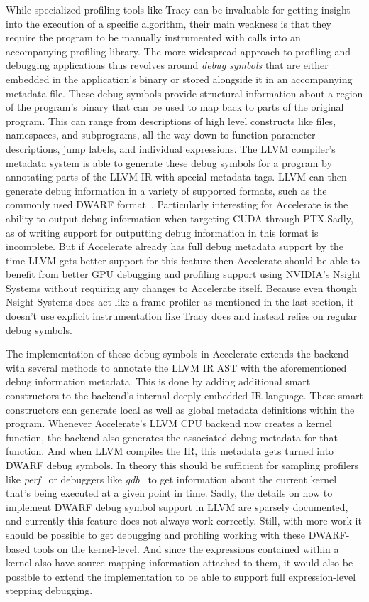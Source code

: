 \documentclass[fontsize=11pt,a4paper,parskip=half,numbers=noenddot]{scrartcl}
\begin{document}
While specialized profiling tools like Tracy can be invaluable for getting
insight into the execution of a specific algorithm, their main weakness is that
they require the program to be manually instrumented with calls into an
accompanying profiling library. The more widespread approach to profiling and
debugging applications thus revolves around \emph{debug symbols} that are either
embedded in the application's binary or stored alongside it in an accompanying
metadata file. These debug symbols provide structural information about a region
of the program's binary that can be used to map back to parts of the original
program. This can range from descriptions of high level constructs like files,
namespaces, and subprograms, all the way down to function parameter
descriptions, jump labels, and individual expressions. The LLVM compiler's
metadata system is able to generate these debug symbols for a program by
annotating parts of the LLVM IR with special metadata tags. LLVM can then
generate debug information in a variety of supported formats, such as the
commonly used DWARF format~\cite{dwarf-debug-symbols}. Particularly interesting
for Accelerate is the ability to output debug information when targeting CUDA
through PTX.\@ Sadly, as of writing support for outputting debug information in
this format is incomplete. But if Accelerate already has full debug metadata
support by the time LLVM gets better support for this feature then Accelerate
should be able to benefit from better GPU debugging and profiling support using
NVIDIA's Nsight Systems without requiring any changes to Accelerate itself.
Because even though Nsight Systems does act like a frame profiler as mentioned
in the last section, it doesn't use explicit instrumentation like Tracy does and
instead relies on regular debug symbols.

The implementation of these debug symbols in Accelerate extends the backend with
several methods to annotate the LLVM IR AST with the aforementioned debug
information metadata. This is done by adding additional smart constructors to
the backend's internal deeply embedded IR language. These smart constructors can
generate local as well as global metadata definitions within the program.
Whenever Accelerate's LLVM CPU backend now creates a kernel function, the
backend also generates the associated debug metadata for that function. And when
LLVM compiles the IR, this metadata gets turned into DWARF debug symbols. In
theory this should be sufficient for sampling profilers like
\emph{perf}~\cite{perf-profiler-wiki} or debuggers like
\emph{gdb}~\cite{Stallman:1989:GMGa} to get information about the current kernel
that's being executed at a given point in time. Sadly, the details on how to
implement DWARF debug symbol support in LLVM are sparsely documented, and
currently this feature does not always work correctly. Still, with more work it
should be possible to get debugging and profiling working with these DWARF-based
tools on the kernel-level. And since the expressions contained within a kernel
also have source mapping information attached to them, it would also be possible
to extend the implementation to be able to support full expression-level
stepping debugging.
\end{document}
